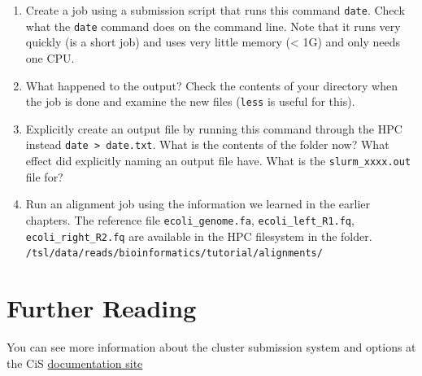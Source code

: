 \documentclass[]{book}
\providecommand{\tightlist}{%
  \setlength{\itemsep}{0pt}\setlength{\parskip}{0pt}}
\begin{document}
\begin{enumerate}
\def\labelenumi{\arabic{enumi}.}
\tightlist
\item
  Create a job using a submission script that runs this command \texttt{date}. Check what the \texttt{date} command does on the command line. Note that it runs very quickly (is a short job) and uses very little memory (\textless{} 1G) and only needs one CPU.
\item
  What happened to the output? Check the contents of your directory when the job is done and examine the new files (\texttt{less} is useful for this).
\item
  Explicitly create an output file by running this command through the HPC instead \texttt{date\ \textgreater{}\ date.txt}. What is the contents of the folder now? What effect did explicitly naming an output file have. What is the \texttt{slurm\_xxxx.out} file for?
\item
  Run an alignment job using the information we learned in the earlier chapters. The reference file \texttt{ecoli\_genome.fa}, \texttt{ecoli\_left\_R1.fq}, \texttt{ecoli\_right\_R2.fq} are available in the HPC filesystem in the folder. \texttt{/tsl/data/reads/bioinformatics/tutorial/alignments/}
\end{enumerate}

\hypertarget{further-reading-3}{%
\section{Further Reading}\label{further-reading-3}}

You can see more information about the cluster submission system and options at the CiS \href{https://docs.cis.nbi.ac.uk/display/CIS/Run+a+simple+job+on+the+cluster}{documentation site}


\end{document}
